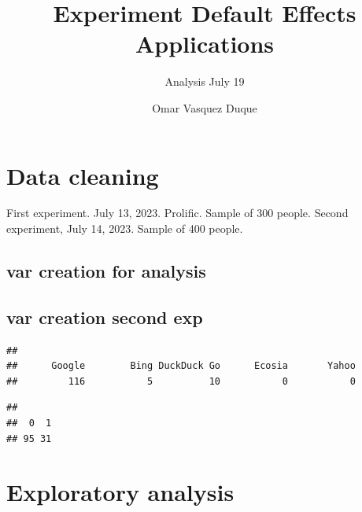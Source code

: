 \documentclass[
  11pt,
]{article}
\title{Experiment Default Effects Applications}
\subtitle{Analysis July 19}
\author{Omar Vasquez Duque}
\date{}
\newenvironment{Shaded}{\begin{snugshade}}{\end{snugshade}}
\newcommand{\FunctionTok}[1]{\textcolor[rgb]{0.13,0.29,0.53}{\textbf{#1}}}
\newcommand{\NormalTok}[1]{#1}
\newcommand{\SpecialCharTok}[1]{\textcolor[rgb]{0.81,0.36,0.00}{\textbf{#1}}}
\begin{document}
\maketitle

\hypertarget{data-cleaning}{%
\section{Data cleaning}\label{data-cleaning}}

First experiment. July 13, 2023. Prolific. Sample of 300 people. Second experiment, July 14, 2023. Sample of 400 people.

\hypertarget{var-creation-for-analysis}{%
\subsection{var creation for analysis}\label{var-creation-for-analysis}}

\hypertarget{var-creation-second-exp}{%
\subsection{var creation second exp}\label{var-creation-second-exp}}

\begin{Shaded}
\end{Shaded}

\begin{verbatim}
## 
##      Google        Bing DuckDuck Go      Ecosia       Yahoo 
##         116           5          10           0           0
\end{verbatim}

\begin{Shaded}
\end{Shaded}

\begin{verbatim}
## 
##  0  1 
## 95 31
\end{verbatim}

\hypertarget{exploratory-analysis}{%
\section{Exploratory analysis}\label{exploratory-analysis}}
\end{document}
